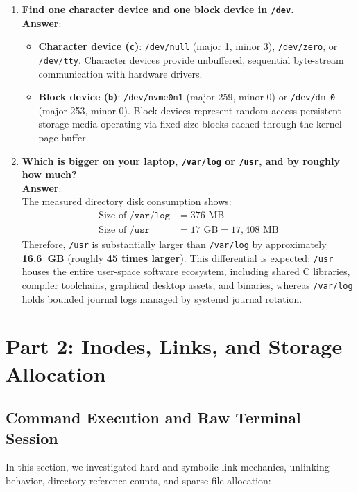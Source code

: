 \documentclass[12pt,a4paper]{article}
\begin{document}
\begin{enumerate}
    \item \textbf{Find one character device and one block device in \texttt{/dev}.} \\
    \textbf{Answer}:
    \begin{itemize}
        \item \textbf{Character device (\texttt{c})}: \texttt{/dev/null} (major 1, minor 3), \texttt{/dev/zero}, or \texttt{/dev/tty}. Character devices provide unbuffered, sequential byte-stream communication with hardware drivers.
        \item \textbf{Block device (\texttt{b})}: \texttt{/dev/nvme0n1} (major 259, minor 0) or \texttt{/dev/dm-0} (major 253, minor 0). Block devices represent random-access persistent storage media operating via fixed-size blocks cached through the kernel page buffer.
    \end{itemize}

    \item \textbf{Which is bigger on your laptop, \texttt{/var/log} or \texttt{/usr}, and by roughly how much?} \\
    \textbf{Answer}: \\
    The measured directory disk consumption shows:
    \begin{align*}
        \text{Size of } \texttt{/var/log} &= 376\text{ MB} \\
        \text{Size of } \texttt{/usr} &= 17\text{ GB} = 17,408\text{ MB}
    \end{align*}
    Therefore, \texttt{/usr} is substantially larger than \texttt{/var/log} by approximately \textbf{16.6~GB} (roughly \textbf{45 times larger}). This differential is expected: \texttt{/usr} houses the entire user-space software ecosystem, including shared C libraries, compiler toolchains, graphical desktop assets, and binaries, whereas \texttt{/var/log} holds bounded journal logs managed by systemd journal rotation.
\end{enumerate}

\newpage

\section{Part 2: Inodes, Links, and Storage Allocation}

\subsection{Command Execution and Raw Terminal Session}
In this section, we investigated hard and symbolic link mechanics, unlinking behavior, directory reference counts, and sparse file allocation:
\end{document}
